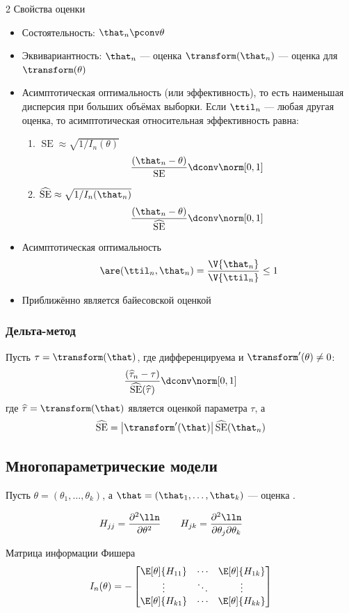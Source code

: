 \documentclass[landscape]{article}
\def\se{\ensuremath{\operatorname{SE}}\xspace}
\def\sehat{\ensuremath{\widehat{\mathrm{SE}}}}
\begin{document}
\begin{multicols*}{2}
Свойства оценки \mle
\begin{itemize}
  \item Состоятельность: $\that_n \pconv \theta$
  \item Эквивариантность:
    $\that_n$ — оценка \mle
    \imp $\transform(\that_n)$ — оценка \mle для $\transform(\theta)$
  \item Асимптотическая оптимальность (или эффективность), то есть наименьшая дисперсия
    при больших объёмах выборки. Если $\ttil_n$ — любая другая оценка, то
    асимптотическая относительная эффективность равна:
    \begin{enumerate}
      \item $\se \approx \sqrt{1/I_n(\theta)}$
        \[\frac{(\that_n - \theta)}{\se} \dconv \norm[0,1]\]
      \item $\sehat \approx \sqrt{1/I_n(\that_n)}$
        \[\frac{(\that_n - \theta)}{\sehat} \dconv \norm[0,1]\]
    \end{enumerate}
  \item Асимптотическая оптимальность
    \[\are(\ttil_n, \that_n)
      = \frac{\V{\that_n}}{\V{\ttil_n}}
      \le 1\]
  \item Приближённо является байесовской оценкой
\end{itemize}

\subsubsection{Дельта-метод}
Пусть $\tau=\transform(\that)$,
где \transform дифференцируема и $\transform'(\theta) \neq 0$:
\[\frac{(\widehat{\tau}_n-\tau)}{\sehat(\widehat{\tau})} \dconv \norm[0,1]\]
где $\widehat{\tau} = \transform(\that)$
является оценкой \mle параметра $\tau$, а
\[\sehat = \left|\transform'(\that)\right|\sehat(\that_n)\]

\subsection{Многопараметрические модели}

Пусть $\theta=(\theta_1,\dots,\theta_k)$,
а $\that= (\that_1,\dots,\that_k)$ — оценка \mle.

\[H_{jj} = \frac{\partial^2 \lln}{\partial\theta^2} \qquad
H_{jk} = \frac{\partial^2 \lln}{\partial\theta_j\partial\theta_k} \qquad\]

Матрица информации Фишера
\[I_n(\theta) = -\begin{bmatrix}
  \E[\theta]{H_{11}} & \cdots & \E[\theta]{H_{1k}} \\
  \vdots & \ddots & \vdots \\
  \E[\theta]{H_{k1}} & \cdots & \E[\theta]{H_{kk}}
\end{bmatrix}\]


\end{multicols*}
\end{document}
